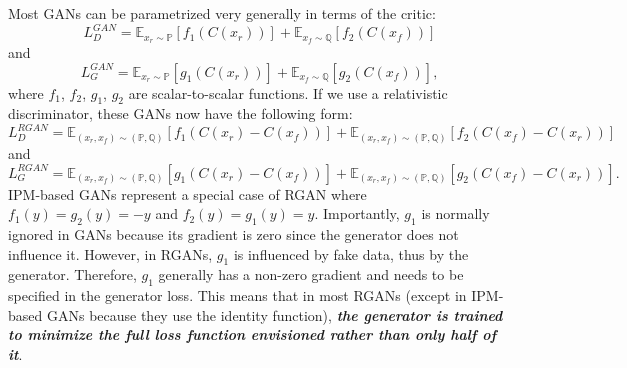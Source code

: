 \documentclass{article}
\begin{document}
Most GANs can be parametrized very generally in terms of the critic:
\begin{equation}
L_D^{GAN} = \mathbb{E}_{x_r \sim \mathbb{P}}\left[ f_1(C(x_r)) \right] + \mathbb{E}_{x_f \sim \mathbb{Q}} \left[ f_2(C(x_f)) \right]
\end{equation}
and
\begin{equation}
L_G^{GAN} = \mathbb{E}_{x_r \sim \mathbb{P}}\left[ g_1(C(x_r)) \right] + \mathbb{E}_{x_f \sim \mathbb{Q}}\left[ g_2(C(x_f)) \right],
\end{equation}
where $f_1$, $f_2$, $g_1$, $g_2$ are scalar-to-scalar functions. If we use a relativistic discriminator, these GANs now have the following form:
\begin{equation}
L_D^{RGAN} = \mathbb{E}_{(x_r,x_f) \sim (\mathbb{P},\mathbb{Q})}\left[ f_1(C(x_r)-C(x_f)) \right] + \mathbb{E}_{(x_r,x_f) \sim (\mathbb{P},\mathbb{Q})} \left[ f_2(C(x_f)-C(x_r)) \right]
\end{equation}
and
\begin{equation}
L_G^{RGAN} = \mathbb{E}_{(x_r,x_f) \sim (\mathbb{P},\mathbb{Q})}\left[ g_1(C(x_r)-C(x_f)) \right] + \mathbb{E}_{(x_r,x_f) \sim (\mathbb{P},\mathbb{Q})}\left[ g_2(C(x_f)-C(x_r)) \right].
\end{equation}
IPM-based GANs represent a special case of RGAN where $f_1(y)=g_2(y)=-y$ and $f_2(y)=g_1(y)=y$. Importantly, $g_1$ is normally ignored in GANs because its gradient is zero since the generator does not influence it. However, in RGANs, $g_1$ is influenced by fake data, thus by the generator. Therefore, $g_1$ generally has a non-zero gradient and needs to be specified in the generator loss. This means that in most RGANs (except in IPM-based GANs because they use the identity function), \textbf{\textit{the generator is trained to minimize the full loss function envisioned rather than only half of it}}.
\end{document}
